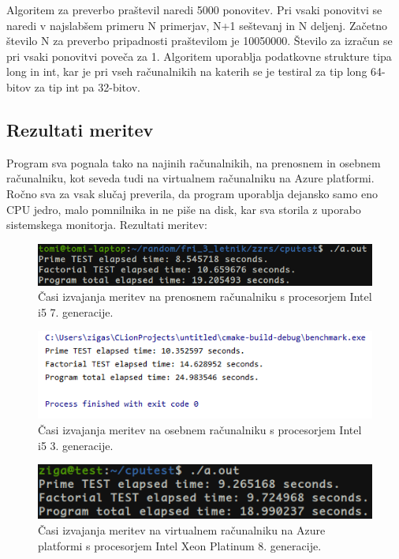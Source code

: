 Algoritem za preverbo praštevil naredi 5000 ponovitev. Pri vsaki ponovitvi se naredi v najslabšem primeru N primerjav, N+1 seštevanj in N deljenj. Začetno število N za preverbo pripadnosti praštevilom je 10050000. Število za izračun se pri vsaki ponovitvi poveča za 1. Algoritem uporablja podatkovne strukture tipa long in int, kar je pri vseh računalnikih na katerih se je testiral za tip long 64-bitov za tip int pa 32-bitov. 



\subsection{Rezultati meritev}

Program sva pognala tako na najinih računalnikih, na prenosnem in osebnem računalniku, kot seveda tudi na virtualnem računalniku na Azure platformi. Ročno sva za vsak slučaj preverila, da program uporablja dejansko samo eno CPU jedro, malo pomnilnika in ne piše na disk, kar sva storila z uporabo sistemskega monitorja. Rezultati meritev:

\begin{figure}[H]
	\centering
	\includegraphics[scale=0.66]{Img/Tomaz_cputest.png}
	\caption{Časi izvajanja meritev na prenosnem računalniku s procesorjem Intel i5 7. generacije.}
	\label{fig:7_breme2}
\end{figure}

\begin{figure}[H]
	\centering
	\includegraphics[scale=0.8]{Img/Ziga_cputest.png}
	\caption{Časi izvajanja meritev na osebnem računalniku s procesorjem Intel i5 3. generacije.}
	\label{fig:7_breme2}
\end{figure}

\begin{figure}[H]
	\centering
	\includegraphics[scale=0.66]{Img/Azure_cputest.png}
	\caption{Časi izvajanja meritev na virtualnem računalniku na Azure platformi s procesorjem Intel Xeon Platinum 8. generacije.}
	\label{fig:7_breme2}
\end{figure}

